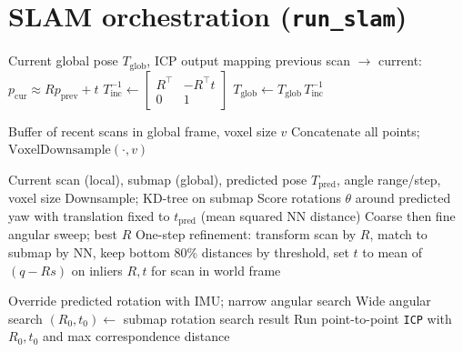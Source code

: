 \documentclass[11pt,a4paper]{article}
\begin{document}
\section{SLAM orchestration (\texttt{run\_slam})}

\begin{algorithm}
\caption{Accumulate ICP increment into global pose (\texttt{apply\_incremental\_pose\_2d})}
\begin{algorithmic}[1]
\Require Current global pose $T_{\mathrm{glob}}$, ICP output mapping previous scan $\to$ current: $p_{\mathrm{cur}} \approx R p_{\mathrm{prev}} + t$
\State $T_{\mathrm{inc}}^{-1} \gets \begin{bmatrix} R^\top & -R^\top t \\ 0 & 1 \end{bmatrix}$ 
\State $T_{\mathrm{glob}} \gets T_{\mathrm{glob}}\, T_{\mathrm{inc}}^{-1}$
\end{algorithmic}
\end{algorithm}

\begin{algorithm}
\caption{Submap construction (\texttt{\_build\_submap})}
\begin{algorithmic}[1]
\Require Buffer of recent scans in global frame, voxel size $v$
\State Concatenate all points; \Return $\mathrm{VoxelDownsample}(\cdot, v)$
\end{algorithmic}
\end{algorithm}

\begin{algorithm}
\caption{Submap alignment: local rotation search + translation tweak (\texttt{\_submap\_rotation\_search})}
\begin{algorithmic}[1]
\Require Current scan (local), submap (global), predicted pose $T_{\mathrm{pred}}$, angle range/step, voxel size
\State Downsample; KD-tree on submap
\State Score rotations $\theta$ around predicted yaw with translation fixed to $t_{\mathrm{pred}}$ (mean squared NN distance)
\State Coarse then fine angular sweep; best $R$
\State One-step refinement: transform scan by $R$, match to submap by NN, keep bottom 80\% distances by threshold, set $t$ to mean of $(q - R s)$ on inliers
\Ensure $R, t$ for scan in world frame
\end{algorithmic}
\end{algorithm}

\begin{algorithm}
\caption{Submap ICP (\texttt{\_attempt\_submap\_icp})}
\begin{algorithmic}[1]
    \State Override predicted rotation with IMU; narrow angular search
\Else
    \State Wide angular search
\EndIf
\State $(R_0, t_0) \gets$ submap rotation search result
\State Run point-to-point \texttt{ICP} with $R_0,t_0$ and max correspondence distance
\end{algorithmic}
\end{algorithm}
\end{document}
